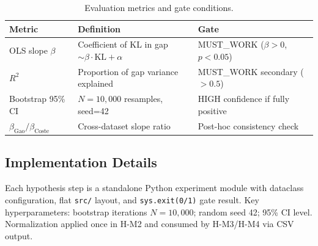 \begin{table}[h]
\centering
\caption{Evaluation metrics and gate conditions.}
\label{tab:metrics}
\begin{tabular}{lll}
\toprule
Metric & Definition & Gate \\
\midrule
OLS slope $\beta$ & Coefficient of KL in gap $\sim \beta \cdot \text{KL} + \alpha$ & MUST\_WORK ($\beta > 0$, $p < 0.05$) \\
$R^2$ & Proportion of gap variance explained & MUST\_WORK secondary ($> 0.5$) \\
Bootstrap 95\% CI & $N=10{,}000$ resamples, seed=42 & HIGH confidence if fully positive \\
$\beta_\text{Gao} / \beta_\text{Coste}$ & Cross-dataset slope ratio & Post-hoc consistency check \\
\bottomrule
\end{tabular}
\end{table}

\subsection{Implementation Details}

Each hypothesis step is a standalone Python experiment module with dataclass configuration, flat \texttt{src/} layout, and \texttt{sys.exit(0/1)} gate result. Key hyperparameters: bootstrap iterations $N=10{,}000$; random seed 42; 95\% CI level. Normalization applied once in H-M2 and consumed by H-M3/H-M4 via CSV output.
